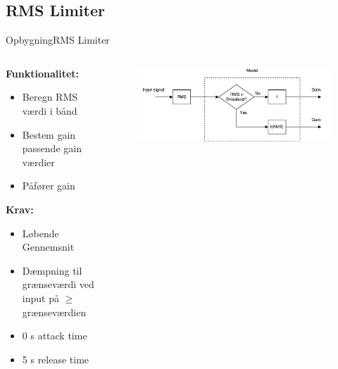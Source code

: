 \subsection{RMS Limiter}
\begin{frame}{Opbygning}{RMS Limiter}
\begin{columns}
  \begin{column}{0.4\textwidth}
  \textbf{Funktionalitet:}
\begin{itemize}
\item Beregn RMS værdi i bånd
\item Bestem gain passende gain værdier
\item Påfører gain
\end{itemize}
\textbf{Krav:}
\begin{itemize}
\item Løbende Gennemsnit
\item \alert{Dæmpning til grænseværdi ved input på $\geq$ grænseværdien}
\item 0 s attack time
\item 5 s release time
\end{itemize}
  \end{column}

  \begin{column}{0.6\textwidth}
\begin{figure}
\centering
\includegraphics[width=\textwidth]{designRealRMS}
\end{figure}


  \end{column}
\end{columns}
\end{frame}


